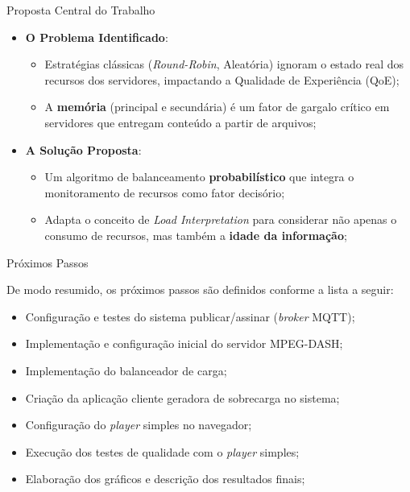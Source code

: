 \documentclass[10pt]{beamer}
\begin{document}
\begin{frame}{Proposta Central do Trabalho}

\begin{itemize}
    \item \textbf{O Problema Identificado}:
    \begin{itemize}
        \item Estratégias clássicas (\textit{Round-Robin}, Aleatória) ignoram o estado real dos recursos dos servidores, impactando a Qualidade de Experiência (QoE);
        \item A \textbf{memória} (principal e secundária) é um fator de gargalo crítico em servidores que entregam conteúdo a partir de arquivos;
    \end{itemize}
    
    \item \textbf{A Solução Proposta}:
    \begin{itemize}
        \item Um algoritmo de balanceamento \textbf{probabilístico} que integra o monitoramento de recursos como fator decisório;
        \item Adapta o conceito de \textit{Load Interpretation} para considerar não apenas o consumo de recursos, mas também a \textbf{idade da informação};
    \end{itemize}
\end{itemize}

\end{frame}

\begin{frame}{Próximos Passos}

De modo resumido, os próximos passos são definidos conforme a lista a seguir:

\begin{itemize}
    \item[1.] Configuração e testes do sistema publicar/assinar (\textit{broker} MQTT);
    \item[2.] Implementação e configuração inicial do servidor MPEG-DASH;
    \item[3.] Implementação do balanceador de carga;
    \item[4.] Criação da aplicação cliente geradora de sobrecarga no sistema;
    \item[5.] Configuração do \textit{player} simples no navegador;
    \item[6.] Execução dos testes de qualidade com o \textit{player} simples;
    \item[7.] Elaboração dos gráficos e descrição dos resultados finais;
\end{itemize}

\end{frame}
\end{document}
